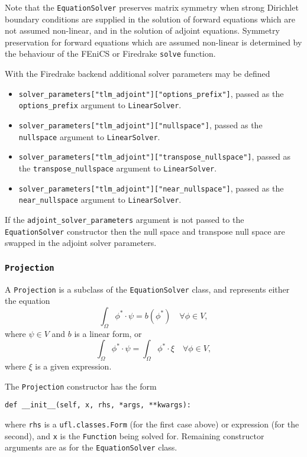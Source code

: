 \documentclass[11pt]{article}
\begin{document}
Note that the \texttt{EquationSolver} preserves matrix symmetry when strong
Dirichlet boundary conditions are supplied in the solution of forward equations
which are not assumed non-linear, and in the solution of adjoint equations.
Symmetry preservation for forward equations which are assumed non-linear is
determined by the behaviour of the FEniCS or Firedrake \texttt{solve} function.

With the Firedrake backend additional solver parameters may be defined
\begin{itemize}
  \item \texttt{solver\_parameters["tlm\_adjoint"]["options\_prefix"]}, passed
    as the \texttt{options\_prefix} argument to \texttt{LinearSolver}.
  \item \texttt{solver\_parameters["tlm\_adjoint"]["nullspace"]},
    passed as the \texttt{nullspace} argument to \texttt{LinearSolver}. 
  \item \texttt{solver\_parameters["tlm\_adjoint"]["transpose\_nullspace"]},
    passed as the \texttt{transpose\_nullspace} argument to
    \texttt{LinearSolver}. 
  \item \texttt{solver\_parameters["tlm\_adjoint"]["near\_nullspace"]}, passed
    as the \texttt{near\_nullspace} argument to \texttt{LinearSolver}. 
\end{itemize}
If the \texttt{adjoint\_solver\_parameters} argument is not passed to the
\texttt{EquationSolver} constructor then the null space and transpose null
space are swapped in the adjoint solver parameters.

\subsubsection{\texttt{Projection}}

A \texttt{Projection} is a subclass of the \texttt{EquationSolver} class, and
represents either the equation
\begin{equation*}
  \int_\Omega \phi^* \cdot \psi = b \left( \phi^* \right) \quad \forall \phi \in V,
\end{equation*}
where $\psi \in V$ and $b$ is a linear form, or
\begin{equation*}
  \int_\Omega \phi^* \cdot \psi = \int_\Omega \phi^* \cdot \xi \quad \forall \phi \in V,
\end{equation*}
where $\xi$ is a given expression.

The \texttt{Projection} constructor has the form
\begin{lstlisting}
def __init__(self, x, rhs, *args, **kwargs):
\end{lstlisting}
where \texttt{rhs} is a \texttt{ufl.classes.Form} (for the first case above) or
expression (for the second), and \texttt{x} is the \texttt{Function} being
solved for. Remaining constructor arguments are as for the
\texttt{EquationSolver} class.
\end{document}
